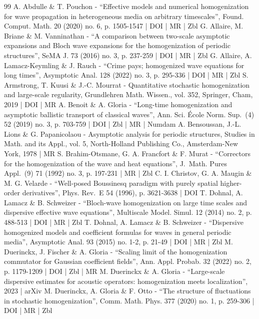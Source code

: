 \begin{thebibliography}{99}
A. Abdulle \& T. Pouchon - “Effective models and numerical homogenization for wave propagation in heterogeneous media on arbitrary timescales”, Found. Comput. Math. 20 (2020) no. 6, p. 1505-1547 | DOI | MR | Zbl
G. Allaire, M. Briane \& M. Vanninathan - “A comparison between two-scale asymptotic expansions and Bloch wave expansions for the homogenization of periodic structures”, SeMA J. 73 (2016) no. 3, p. 237-259 | DOI | MR | Zbl
G. Allaire, A. Lamacz-Keymling \& J. Rauch - “Crime pays; homogenized wave equations for long times”, Asymptotic Anal. 128 (2022) no. 3, p. 295-336 | DOI | MR | Zbl
S. Armstrong, T. Kuusi \& J.-C. Mourrat - Quantitative stochastic homogenization and large-scale regularity, Grundlehren Math. Wissen., vol. 352, Springer, Cham, 2019 | DOI | MR
A. Benoit \& A. Gloria - “Long-time homogenization and asymptotic ballistic transport of classical waves”, Ann. Sci. École Norm. Sup. (4) 52 (2019) no. 3, p. 703-759 | DOI | Zbl | MR | Numdam
A. Bensoussan, J.-L. Lions \& G. Papanicolaou - Asymptotic analysis for periodic structures, Studies in Math. and its Appl., vol. 5, North-Holland Publishing Co., Amsterdam-New York, 1978 | MR
S. Brahim-Otsmane, G. A. Francfort \& F. Murat - “Correctors for the homogenization of the wave and heat equations”, J. Math. Pures Appl. (9) 71 (1992) no. 3, p. 197-231 | MR | Zbl
C. I. Christov, G. A. Maugin \& M. G. Velarde - “Well-posed Boussinesq paradigm with purely spatial higher-order derivatives”, Phys. Rev. E 54 (1996), p. 3621-3638 | DOI
T. Dohnal, A. Lamacz \& B. Schweizer - “Bloch-wave homogenization on large time scales and dispersive effective wave equations”, Multiscale Model. Simul. 12 (2014) no. 2, p. 488-513 | DOI | MR | Zbl
T. Dohnal, A. Lamacz \& B. Schweizer - “Dispersive homogenized models and coefficient formulas for waves in general periodic media”, Asymptotic Anal. 93 (2015) no. 1-2, p. 21-49 | DOI | MR | Zbl
M. Duerinckx, J. Fischer \& A. Gloria - “Scaling limit of the homogenization commutator for Gaussian coefficient fields”, Ann. Appl. Probab. 32 (2022) no. 2, p. 1179-1209 | DOI | Zbl | MR
M. Duerinckx \& A. Gloria - “Large-scale dispersive estimates for acoustic operators: homogenization meets localization”, 2023 | arXiv
M. Duerinckx, A. Gloria \& F. Otto - “The structure of fluctuations in stochastic homogenization”, Comm. Math. Phys. 377 (2020) no. 1, p. 259-306 | DOI | MR | Zbl

\end{thebibliography}
